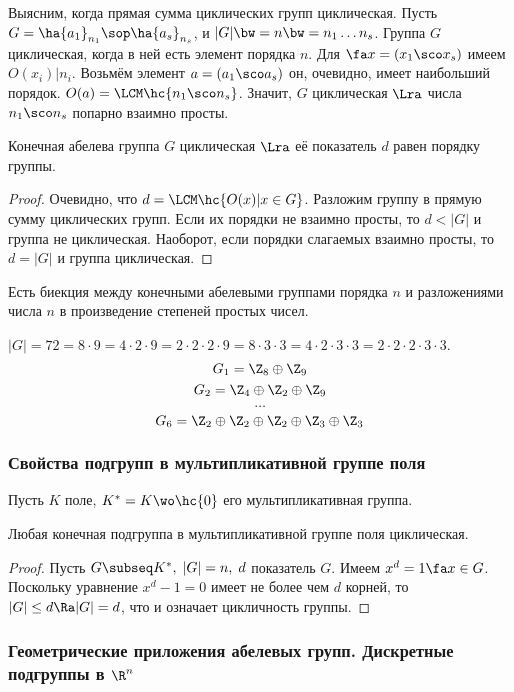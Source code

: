 \documentclass[a4paper]{article}
\begin{document}
Выясним, когда прямая сумма циклических групп циклическая. Пусть $G= \ha{a_1}_{n_1} \sop \ha{a_s}_{n_s}$, и
$|G| \bw = n \bw = n_1 \ldots n_s$. Группа $G$ циклическая, когда в ней есть элемент порядка $n$. Для $\fa x=(x_1
\sco x_s)$ имеем  $O(x_i) | n_i$. Возьмём элемент $a=(a_1 \sco a_s)$ он, очевидно, имеет наибольший
порядок. $O(a)=\LCM\hc{n_1 \sco n_s}$. Значит, $G$ циклическая $\Lra$ числа $n_1 \sco n_s$ попарно
взаимно просты.

\begin{stm}
Конечная абелева группа $G$ циклическая $\Lra$ её показатель $d$ равен порядку группы.
\end{stm}
\begin{proof}
Очевидно, что $d=\LCM\hc{O(x) | x \in G}$. Разложим группу в прямую сумму циклических групп. Если их  порядки
не взаимно просты, то $d < |G|$ и группа не циклическая. Наоборот, если порядки слагаемых взаимно просты, то
$d=|G|$ и группа циклическая.
\end{proof}

Есть биекция между конечными абелевыми группами порядка $n$ и разложениями числа $n$ в произведение  степеней
простых чисел.

\begin{ex}
$|G|=72=8\cdot 9 = 4\cdot 2\cdot 9 = 2\cdot 2\cdot 2\cdot 9 = 8\cdot 3\cdot 3 = 4\cdot 2\cdot 3\cdot 3 = 2\cdot 2\cdot 2\cdot 3\cdot 3$.
$$G_1 = \Z_8 \oplus \Z_9$$
$$G_2 = \Z_4 \oplus \Z_2 \oplus \Z_9$$
$$\ldots$$
$$G_6 = \Z_2 \oplus \Z_2 \oplus \Z_2 \oplus \Z_3 \oplus \Z_3$$
\end{ex}

\subsubsection{Свойства подгрупп в мультипликативной группе поля}

Пусть $K$ поле, $K^*=K \wo \hc{0}$ его мультипликативная группа.

\begin{stm}
Любая конечная подгруппа в мультипликативной группе поля циклическая.
\end{stm}
\begin{proof}
Пусть $G \subseq K^*, \; |G|=n, \; d$ показатель $G$. Имеем $x^d = 1 \fa x \in G$. Поскольку уравнение
$x^d-1=0$ имеет не более чем $d$ корней, то $|G| \le d \Ra |G|=d$, что и означает цикличность группы.
\end{proof}

\subsubsection{Геометрические приложения абелевых групп. Дискретные подгруппы в $\R^n$}
\end{document}

